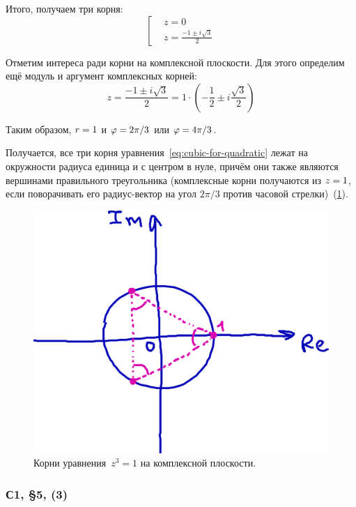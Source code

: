 \documentclass[a4paper,12pt]{article}
\begin{document}
  Итого, получаем три корня:
  \[
    \left[
      \begin{aligned}
          &z = 0\\
          &z = \frac{-1 \pm i\sqrt{3}}{2}
      \end{aligned}
    \right.
  \]

  Отметим интереса ради корни на комплексной плоскости.
  Для этого определим ещё модуль и аргумент комплексных корней:
  \[
    z = \frac{-1 \pm i\sqrt{3}}{2} = 1 \cdot \left(-\frac{1}{2} \pm i\frac{\sqrt{3}}{2}\right)
  \]

  Таким образом, $r \hm= 1$ и $\phi \hm= 2\pi/3$ или $\phi \hm= 4\pi/3$.

  Получается, все три корня уравнения~\eqref{eq:cubic-for-quadratic} лежат на окружности радиуса единица и с центром в нуле, причём они также являются вершинами правильного треугольника (комплексные корни получаются из $z \hm= 1$, если поворачивать его радиус-вектор на угол $2\pi/3$ против часовой стрелки)~(\ref{fig:cubic-roots}).

  \begin{figure}[ht]
    \centering
    \includegraphics[width=0.6\linewidth]{images/cubic-roots}
    
    \caption{
      Корни уравнения~$z^3 = 1$ на комплексной плоскости.
    }
    \label{fig:cubic-roots}
  \end{figure}

  
  \subsubsection{С1, \S 5, (3)}
\end{document}
